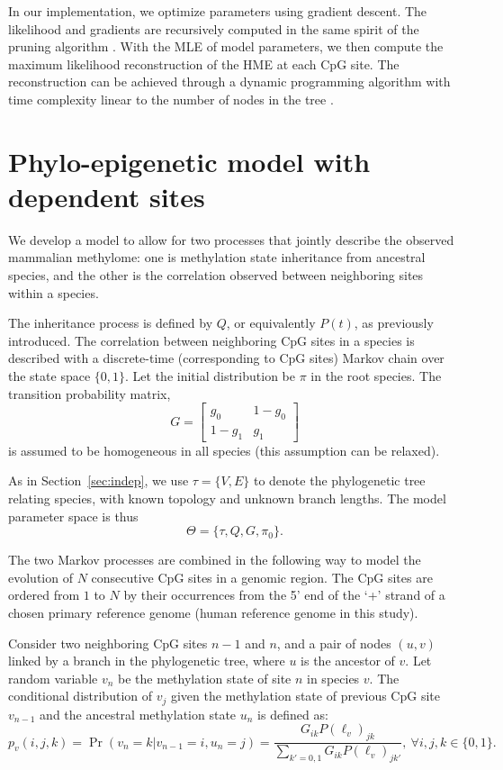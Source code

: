 \documentclass[11pt]{article}
\theoremstyle{theorem}
\theoremstyle{proposition}
\begin{document}
In our implementation, we optimize parameters using gradient descent.
The likelihood and gradients are recursively computed in the same
spirit of the pruning algorithm
\citep{felsenstein1981evolutionary}. With the MLE of model parameters,
we then compute the maximum likelihood reconstruction of the HME at
each CpG site. The reconstruction can be achieved through a dynamic
programming algorithm with time complexity linear to the number of
nodes in the tree \citep{pupko2000fast}.

\section{Phylo-epigenetic model with dependent sites}

We develop a model to allow for two processes that jointly
describe the observed mammalian methylome: one is methylation state
inheritance from ancestral species, and the other is the correlation
observed between neighboring sites within a species.

The inheritance process is defined by $Q$, or equivalently $P(t)$, as
previously introduced. The correlation between neighboring CpG sites
in a species is described with a discrete-time (corresponding to CpG
sites) Markov chain over the state space $\{0,1\}$. Let the initial
distribution be $\pi$ in the root species. The transition probability
matrix,
\[
G=\begin{bmatrix}
      g_0  & 1-g_0  \\[0.3em]
      1-g_1 & g_1
    \end{bmatrix}
\]
is assumed to be homogeneous in all species (this assumption can be
relaxed).

As in Section~\ref{sec:indep}, we use $\tau=\{V, E\}$ to denote the
phylogenetic tree relating species, with known topology and unknown
branch lengths. The model parameter space is thus
\[
\Theta=\{\tau, Q, G, \pi_0\}.
\]

The two Markov processes are combined in the following way to model
the evolution of $N$ consecutive CpG sites in a genomic region. The
CpG sites are ordered from $1$ to $N$ by their occurrences from the 5'
end of the `+' strand of a chosen primary reference genome (human
reference genome in this study).

Consider two neighboring CpG sites $n-1$ and $n$, and a pair of nodes $(u, v)$ linked by a branch in the
phylogenetic tree, where $u$ is the ancestor of $v$. Let random variable
$v_n$ be the methylation state of site $n$ in species
$v$. The conditional distribution of $v_j$ given the methylation
state of previous CpG site $v_{n-1}$ and the ancestral methylation state
$u_n$ is defined as:
\begin{equation}\label{eqn:unittrans}
p_v(i,j,k) = \Pr(v_n=k|v_{n-1}=i,u_n=j)=  \frac{G_{ik}P(\ell_v)_{jk}}{\sum_{k'=0,1}G_{ik}P(\ell_v)_{jk'}},~\forall i,j,k\in\{0,1\}.
\end{equation}
\end{document}
